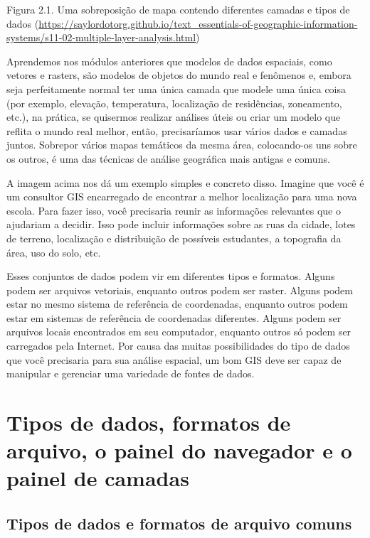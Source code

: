 \documentclass[
]{krantz}
\begin{document}
Figura 2.1. Uma sobreposição de mapa contendo diferentes camadas e tipos de dados (\href{https://saylordotorg.\%20github.io/text_essentials-of-geographic-information-systems/s11-02-multiple-layer-analysis.html}{https://saylordotorg.github.io/text\_essentials-of-geographic-information-systems/s11-02-multiple-layer-analysis.html})

Aprendemos nos módulos anteriores que modelos de dados espaciais, como vetores e rasters, são modelos de objetos do mundo real e fenômenos e, embora seja perfeitamente normal ter uma única camada que modele uma única coisa (por exemplo, elevação, temperatura, localização de residências, zoneamento, etc.), na prática, se quisermos realizar análises úteis ou criar um modelo que reflita o mundo real melhor, então, precisaríamos usar vários dados e camadas juntos. Sobrepor vários mapas temáticos da mesma área, colocando-os uns sobre os outros, é uma das técnicas de análise geográfica mais antigas e comuns.

A imagem acima nos dá um exemplo simples e concreto disso. Imagine que você é um consultor GIS encarregado de encontrar a melhor localização para uma nova escola. Para fazer isso, você precisaria reunir as informações relevantes que o ajudariam a decidir. Isso pode incluir informações sobre as ruas da cidade, lotes de terreno, localização e distribuição de possíveis estudantes, a topografia da área, uso do solo, etc.

Esses conjuntos de dados podem vir em diferentes tipos e formatos. Alguns podem ser arquivos vetoriais, enquanto outros podem ser raster. Alguns podem estar no mesmo sistema de referência de coordenadas, enquanto outros podem estar em sistemas de referência de coordenadas diferentes. Alguns podem ser arquivos locais encontrados em seu computador, enquanto outros só podem ser carregados pela Internet. Por causa das muitas possibilidades do tipo de dados que você precisaria para sua análise espacial, um bom GIS deve ser capaz de manipular e gerenciar uma variedade de fontes de dados.

\hypertarget{tipos-de-dados-formatos-de-arquivo-o-painel-do-navegador-e-o-painel-de-camadas}{%
\section{Tipos de dados, formatos de arquivo, o painel do navegador e o painel de camadas}\label{tipos-de-dados-formatos-de-arquivo-o-painel-do-navegador-e-o-painel-de-camadas}}

\hypertarget{tipos-de-dados-e-formatos-de-arquivo-comuns}{%
\subsection{Tipos de dados e formatos de arquivo comuns}\label{tipos-de-dados-e-formatos-de-arquivo-comuns}}
\end{document}
